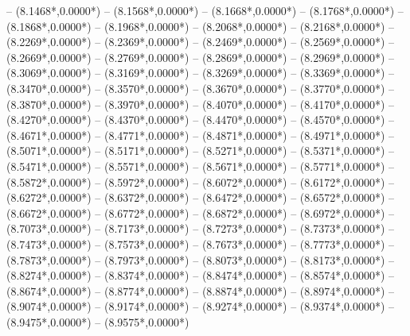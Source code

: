 {	-- ({8.1468*\dx},{0.0000*\dy})
	-- ({8.1568*\dx},{0.0000*\dy})
	-- ({8.1668*\dx},{0.0000*\dy})
	-- ({8.1768*\dx},{0.0000*\dy})
	-- ({8.1868*\dx},{0.0000*\dy})
	-- ({8.1968*\dx},{0.0000*\dy})
	-- ({8.2068*\dx},{0.0000*\dy})
	-- ({8.2168*\dx},{0.0000*\dy})
	-- ({8.2269*\dx},{0.0000*\dy})
	-- ({8.2369*\dx},{0.0000*\dy})
	-- ({8.2469*\dx},{0.0000*\dy})
	-- ({8.2569*\dx},{0.0000*\dy})
	-- ({8.2669*\dx},{0.0000*\dy})
	-- ({8.2769*\dx},{0.0000*\dy})
	-- ({8.2869*\dx},{0.0000*\dy})
	-- ({8.2969*\dx},{0.0000*\dy})
	-- ({8.3069*\dx},{0.0000*\dy})
	-- ({8.3169*\dx},{0.0000*\dy})
	-- ({8.3269*\dx},{0.0000*\dy})
	-- ({8.3369*\dx},{0.0000*\dy})
	-- ({8.3470*\dx},{0.0000*\dy})
	-- ({8.3570*\dx},{0.0000*\dy})
	-- ({8.3670*\dx},{0.0000*\dy})
	-- ({8.3770*\dx},{0.0000*\dy})
	-- ({8.3870*\dx},{0.0000*\dy})
	-- ({8.3970*\dx},{0.0000*\dy})
	-- ({8.4070*\dx},{0.0000*\dy})
	-- ({8.4170*\dx},{0.0000*\dy})
	-- ({8.4270*\dx},{0.0000*\dy})
	-- ({8.4370*\dx},{0.0000*\dy})
	-- ({8.4470*\dx},{0.0000*\dy})
	-- ({8.4570*\dx},{0.0000*\dy})
	-- ({8.4671*\dx},{0.0000*\dy})
	-- ({8.4771*\dx},{0.0000*\dy})
	-- ({8.4871*\dx},{0.0000*\dy})
	-- ({8.4971*\dx},{0.0000*\dy})
	-- ({8.5071*\dx},{0.0000*\dy})
	-- ({8.5171*\dx},{0.0000*\dy})
	-- ({8.5271*\dx},{0.0000*\dy})
	-- ({8.5371*\dx},{0.0000*\dy})
	-- ({8.5471*\dx},{0.0000*\dy})
	-- ({8.5571*\dx},{0.0000*\dy})
	-- ({8.5671*\dx},{0.0000*\dy})
	-- ({8.5771*\dx},{0.0000*\dy})
	-- ({8.5872*\dx},{0.0000*\dy})
	-- ({8.5972*\dx},{0.0000*\dy})
	-- ({8.6072*\dx},{0.0000*\dy})
	-- ({8.6172*\dx},{0.0000*\dy})
	-- ({8.6272*\dx},{0.0000*\dy})
	-- ({8.6372*\dx},{0.0000*\dy})
	-- ({8.6472*\dx},{0.0000*\dy})
	-- ({8.6572*\dx},{0.0000*\dy})
	-- ({8.6672*\dx},{0.0000*\dy})
	-- ({8.6772*\dx},{0.0000*\dy})
	-- ({8.6872*\dx},{0.0000*\dy})
	-- ({8.6972*\dx},{0.0000*\dy})
	-- ({8.7073*\dx},{0.0000*\dy})
	-- ({8.7173*\dx},{0.0000*\dy})
	-- ({8.7273*\dx},{0.0000*\dy})
	-- ({8.7373*\dx},{0.0000*\dy})
	-- ({8.7473*\dx},{0.0000*\dy})
	-- ({8.7573*\dx},{0.0000*\dy})
	-- ({8.7673*\dx},{0.0000*\dy})
	-- ({8.7773*\dx},{0.0000*\dy})
	-- ({8.7873*\dx},{0.0000*\dy})
	-- ({8.7973*\dx},{0.0000*\dy})
	-- ({8.8073*\dx},{0.0000*\dy})
	-- ({8.8173*\dx},{0.0000*\dy})
	-- ({8.8274*\dx},{0.0000*\dy})
	-- ({8.8374*\dx},{0.0000*\dy})
	-- ({8.8474*\dx},{0.0000*\dy})
	-- ({8.8574*\dx},{0.0000*\dy})
	-- ({8.8674*\dx},{0.0000*\dy})
	-- ({8.8774*\dx},{0.0000*\dy})
	-- ({8.8874*\dx},{0.0000*\dy})
	-- ({8.8974*\dx},{0.0000*\dy})
	-- ({8.9074*\dx},{0.0000*\dy})
	-- ({8.9174*\dx},{0.0000*\dy})
	-- ({8.9274*\dx},{0.0000*\dy})
	-- ({8.9374*\dx},{0.0000*\dy})
	-- ({8.9475*\dx},{0.0000*\dy})
	-- ({8.9575*\dx},{0.0000*\dy})
}
